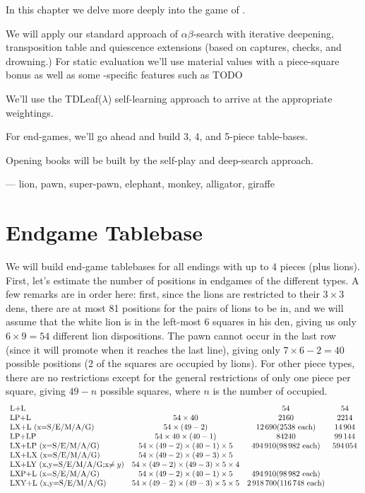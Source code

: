 \documentclass[10pt,dvipdfmx,letterpaper]{report}
\newcommand{\ab}{{$\alpha\beta$}}
\newcommand{\g}[1]{{\sc{#1}}\index{{\sc{#1}}}}
\let\x=\times
\begin{document}
In this chapter we delve more deeply into the game of \g{congo}.

We will apply our standard approach of \ab-search with
iterative deepening, transposition table and quiescence extensions (based on captures,
checks, and drowning.)
For static evaluation we'll use material values with a piece-square bonus as well
as some \g{congo}-specific features such as TODO

We'll use the TDLeaf($\lambda$) self-learning approach to arrive at the appropriate
weightings.

For end-games, we'll go ahead and build 3, 4, and 5-piece table-bases.

Opening books will be built by the self-play and deep-search approach.

--- lion, pawn, super-pawn, elephant, monkey, alligator, giraffe

\section{Endgame Tablebase}

We will build end-game tablebases for all endings with up to 4 pieces (plus lions).
First, let's estimate the number of positions in endgames of the different types.
A few remarks are in order here: first, since the lions are restricted to their $3\x3$ dens, there are
at most 81 positions for the pairs of lions to be in, and we will assume that the white lion
is in the left-most 6 squares in his den, giving us only $6\x9=54$ different lion dispositions.
The pawn cannot occur in the last row (since it will promote when it reaches the last line), giving
only $7\x6-2=40$ possible positions (2 of the squares are occupied by lions).  For other piece types, there
are no restrictions except for the general restrictions of only one piece per square, giving $49-n$ possible
squares, where $n$ is the number of occupied.
\[\begin{array}{lccc}
\text{L+L} & & 54 & 54 \\
\text{LP+L} & 54\x40 & 2160 & 2214 \\
\text{LX+L (x=S/E/M/A/G)} & 54\x(49-2)& 12\,690 \text{(2538 each)} & 14\,904 \\
\text{LP+LP} & 54\x40\x(40-1) & 84240 & 99\,144 \\
\text{LX+LP (x=S/E/M/A/G)} & 54\x(49-2)\x(40-1)\x5& 494\,910 \text{(98\,982 each)} & 594\,054 \\
\text{LX+LX (x=S/E/M/A/G)} & 54\x(49-2)\x(49-3)\x5& \\
\text{LX+LY (x,y=S/E/M/A/G;x$\neq y$)} & 54\x(49-2)\x(49-3)\x5\x4& \\
\text{LXP+L (x=S/E/M/A/G)} & 54\x(49-2)\x(40-1)\x5& 494\,910 \text{(98\,982 each)} & \\
\text{LXY+L (x,y=S/E/M/A/G)} & 54\x(49-2)\x(49-3)\x5\x5& 2\,918\,700 \text{(116\,748 each)} & \\
\end{array}\]
\end{document}
